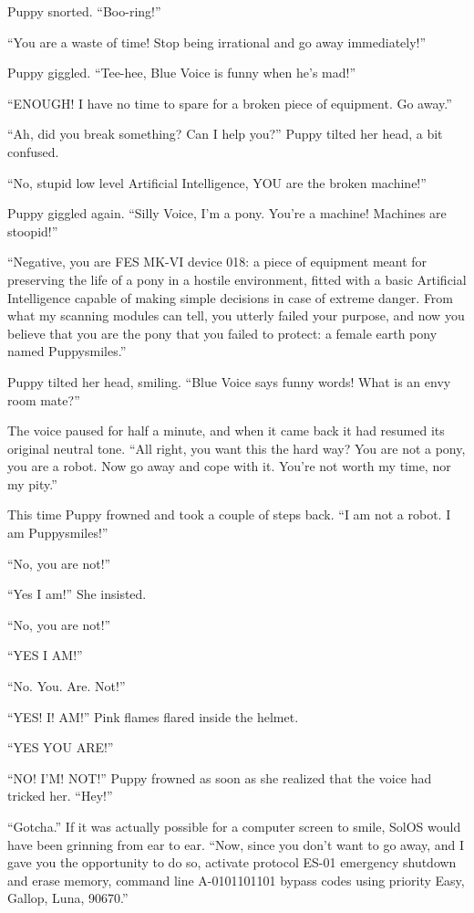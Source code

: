 Puppy snorted. ``Boo-ring!''

``You are a waste of time! Stop being irrational and go away immediately!''

Puppy giggled. ``Tee-hee, Blue Voice is funny when he's mad!''

``ENOUGH! I have no time to spare for a broken piece of equipment. Go away.''

``Ah, did you break something? Can I help you?'' Puppy tilted her head, a bit confused.

``No, stupid low level Artificial Intelligence, YOU are the broken machine!''

Puppy giggled again. ``Silly Voice, I'm a pony. You're a machine! Machines are stoopid!''

``Negative, you are FES MK-VI device 018: a piece of equipment meant for preserving the life of a pony in a hostile environment, fitted with a basic Artificial Intelligence capable of making simple decisions in case of extreme danger. From what my scanning modules can tell, you utterly failed your purpose, and now you believe that you are the pony that you failed to protect: a female earth pony named Puppysmiles.''

Puppy tilted her head, smiling. ``Blue Voice says funny words! What is an envy room mate?''

The voice paused for half a minute, and when it came back it had resumed its original neutral tone. ``All right, you want this the hard way? You are not a pony, you are a robot. Now go away and cope with it. You're not worth my time, nor my pity.''

This time Puppy frowned and took a couple of steps back. ``I am not a robot. I am Puppysmiles!''

``No, you are not!''

``Yes I am!'' She insisted. 

``No, you are not!''

``YES I AM!''

``No. You. Are. Not!''

``YES! I! AM!'' Pink flames flared inside the helmet.

``YES YOU ARE!''

``NO! I'M! NOT!'' Puppy frowned as soon as she realized that the voice had tricked her. ``Hey!''

``Gotcha.'' If it was actually possible for a computer screen to smile, SolOS would have been grinning from ear to ear. ``Now, since you don't want to go away, and I gave you the opportunity to do so, activate protocol ES-01 emergency shutdown and erase memory, command line A-0101101101 bypass codes using priority Easy, Gallop, Luna, 90670.''

